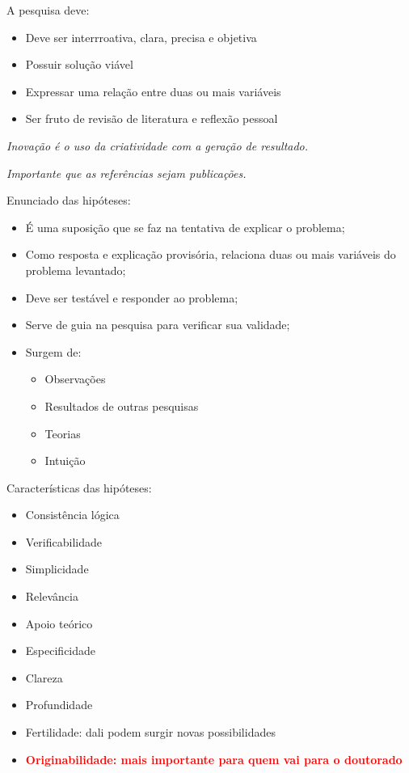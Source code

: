         A pesquisa deve:
        \begin{itemize}
            \item Deve ser interrroativa, clara, precisa e objetiva
            \item Possuir solução viável
            \item Expressar uma relação entre duas ou mais variáveis
            \item Ser fruto de revisão de literatura e reflexão pessoal
        \end{itemize}

        \textit{Inovação é o uso da criatividade com a geração de resultado.}

        \textit{Importante que as referências sejam publicações.}

        Enunciado das hipóteses:
        \begin{itemize}
            \item É uma suposição que se faz na tentativa de explicar o problema;
            \item Como resposta e explicação provisória, relaciona duas ou mais variáveis do problema levantado;
            \item Deve ser testável e responder ao problema;
            \item Serve de guia na pesquisa para verificar sua validade;
            \item Surgem de:
            \begin{itemize}
                \item Observações
                \item Resultados de outras pesquisas
                \item Teorias
                \item Intuição
            \end{itemize}
        \end{itemize}

        Características das hipóteses:
        \begin{itemize}
            \item Consistência lógica
            \item Verificabilidade
            \item Simplicidade
            \item Relevância
            \item Apoio teórico
            \item Especificidade
            \item Clareza
            \item Profundidade
            \item Fertilidade: dali podem surgir novas possibilidades
            \item \textcolor{red}{\textbf{Originabilidade: mais importante para quem vai para o doutorado}}
        \end{itemize}

